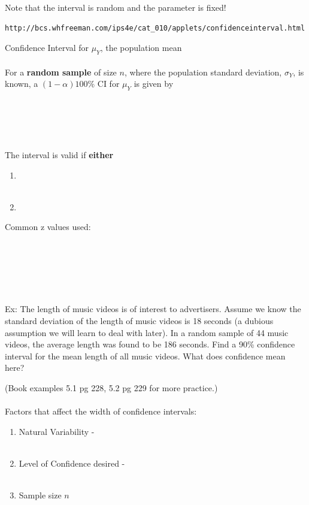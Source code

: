 Note that the interval is random and the parameter is fixed!\\
\begin{verbatim}
http://bcs.whfreeman.com/ips4e/cat_010/applets/confidenceinterval.html
\end{verbatim}

\newpage

\huge Confidence Interval for $\mu_Y$, the population mean \normalsize\\~\\
For a \textbf{random sample} of size $n$, where the population standard deviation, $\sigma_Y$, is known, a $(1-\alpha)100$\% CI for $\mu_Y$ is given by \\~\\~\\~\\~\\~\\
The interval is valid if \textbf{either}\begin{enumerate}
\item ~\\~\\
\item ~\\
\end{enumerate}

Common z values used:\\~\\~\\~\\~\\~\\~\\

Ex: The length of music videos is of interest to advertisers.  Assume we know the standard deviation of the length of music videos is 18 seconds (a dubious assumption we will learn to deal with later). In a random sample of 44 music videos, the average length was found to be 186 seconds. Find a 90\% confidence interval for the mean length of all music videos. What does confidence mean here?

\newpage
(Book examples 5.1 pg 228, 5.2 pg 229 for more practice.)\\~\\
Factors that affect the width of confidence intervals:
\begin{enumerate}
\item Natural Variability -\\~\\
\item Level of Confidence desired -\\~\\
\item Sample size $n$\\~\\~\\
\end{enumerate}

